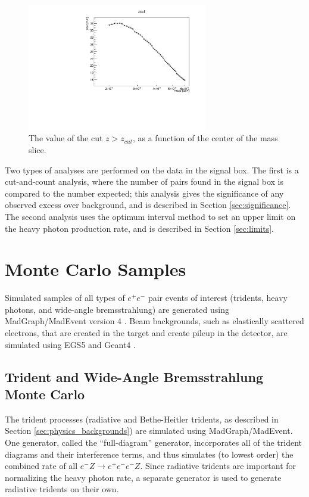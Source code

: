 \begin{figure}[ht]
\begin{center}
    \includegraphics[width=0.7\textwidth,page=1,angle=-90]{vertexing/figs/golden_mres_output}
\end{center}
\caption{The value of the cut $z>z_{cut}$, as a function of the center of the mass slice.}
    \label{fig:zcut}
\end{figure}

Two types of analyses are performed on the data in the signal box.
The first is a cut-and-count analysis, where the number of pairs found in the signal box is compared to the number expected; this analysis gives the significance of any observed excess over background, and is described in Section \ref{sec:significance}.
The second analysis uses the optimum interval method to set an upper limit on the heavy photon production rate, and is described in Section \ref{sec:limits}.

\clearpage
\section{Monte Carlo Samples}
Simulated samples of all types of $e^+e^-$ pair events of interest (tridents, heavy photons, and wide-angle bremsstrahlung) are generated using MadGraph/MadEvent version 4 \cite{alwall_madgraph/madevent_2007}.
Beam backgrounds, such as elastically scattered electrons, that are created in the target and create pileup in the detector, are simulated using EGS5 \cite{hirayama_egs5_2005} and Geant4 \cite{agostinelli_geant4simulation_2003}.

\subsection{Trident and Wide-Angle Bremsstrahlung Monte Carlo}
\label{sec:tri_mc}
The trident processes (radiative and Bethe-Heitler tridents, as described in Section \ref{sec:physics_backgrounds}) are simulated using MadGraph/MadEvent.
One generator, called the ``full-diagram'' generator, incorporates all of the trident diagrams and their interference terms, and thus simulates (to lowest order) the combined rate of all $e^-Z\to e^+e^-e^-Z$.
Since radiative tridents are important for normalizing the heavy photon rate, a separate generator is used to generate radiative tridents on their own.

